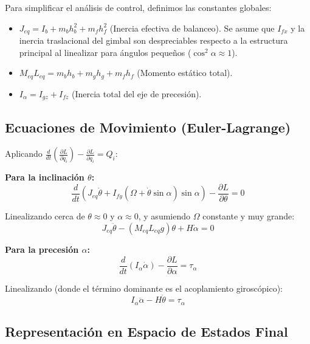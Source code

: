 \documentclass[12pt,letterpaper]{report}
\begin{document}
Para simplificar el análisis de control, definimos las constantes globales:
\begin{itemize}
    \item $J_{eq} = I_b + m_b h_b^2 + m_f h_f^2$ (Inercia efectiva de balanceo). Se asume que $I_{fx}$ y la inercia traslacional del gimbal son despreciables respecto a la estructura principal al linealizar para ángulos pequeños ($\cos^2\alpha \approx 1$).
    \item $M_{eq}L_{eq} = m_b h_b + m_g h_g + m_f h_f$ (Momento estático total).
    \item $I_\alpha = I_{gz} + I_{fz}$ (Inercia total del eje de precesión).
\end{itemize}

\subsection*{Ecuaciones de Movimiento (Euler-Lagrange)}

Aplicando $\frac{d}{dt}\left(\frac{\partial L}{\partial \dot{q}_i}\right) - \frac{\partial L}{\partial q_i} = Q_i$:

\textbf{Para la inclinación $\theta$:}
\begin{equation}
    \frac{d}{dt}(J_{eq}\dot{\theta} + I_{fy}(\Omega + \dot{\theta}\sin\alpha)\sin\alpha) - \frac{\partial L}{\partial \theta} = 0
\end{equation}

Linealizando cerca de $\theta \approx 0$ y $\alpha \approx 0$, y asumiendo $\Omega$ constante y muy grande:
\begin{equation}
    J_{eq}\ddot{\theta} - (M_{eq}L_{eq}g)\theta + H\dot{\alpha} = 0
\end{equation}

\textbf{Para la precesión $\alpha$:}
\begin{equation}
    \frac{d}{dt}(I_\alpha \dot{\alpha}) - \frac{\partial L}{\partial \alpha} = \tau_\alpha
\end{equation}

Linealizando (donde el término dominante es el acoplamiento giroscópico):
\begin{equation}
    I_\alpha \ddot{\alpha} - H\dot{\theta} = \tau_\alpha
\end{equation}

\subsection*{Representación en Espacio de Estados Final}
\end{document}
